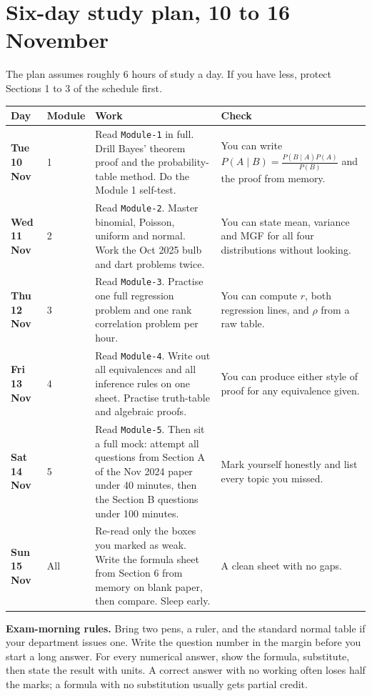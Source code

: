 \documentclass[11pt,a4paper]{article}
\begin{document}
\section{Six-day study plan, 10 to 16 November}

The plan assumes roughly 6 hours of study a day. If you have less, protect Sections 1 to 3 of the schedule first.

\begin{center}\small
\begin{tabularx}{\textwidth}{>{\bfseries}p{} p{} X p{}}
\toprule Day & Module & Work & Check\\\midrule
Tue 10 Nov & 1 & Read \texttt{Module-1} in full. Drill Bayes' theorem proof and the probability-table method. Do the Module 1 self-test. & You can write $P(A\mid B)=\frac{P(B\mid A)P(A)}{P(B)}$ and the proof from memory.\\
Wed 11 Nov & 2 & Read \texttt{Module-2}. Master binomial, Poisson, uniform and normal. Work the Oct 2025 bulb and dart problems twice. & You can state mean, variance and MGF for all four distributions without looking.\\
Thu 12 Nov & 3 & Read \texttt{Module-3}. Practise one full regression problem and one rank correlation problem per hour. & You can compute $r$, both regression lines, and $\rho$ from a raw table.\\
Fri 13 Nov & 4 & Read \texttt{Module-4}. Write out all equivalences and all inference rules on one sheet. Practise truth-table and algebraic proofs. & You can produce either style of proof for any equivalence given.\\
Sat 14 Nov & 5 & Read \texttt{Module-5}. Then sit a full mock: attempt all questions from Section A of the Nov 2024 paper under 40 minutes, then the Section B questions under 100 minutes. & Mark yourself honestly and list every topic you missed.\\
Sun 15 Nov & All & Re-read only the boxes you marked as weak. Write the formula sheet from Section 6 from memory on blank paper, then compare. Sleep early. & A clean sheet with no gaps.\\\bottomrule
\end{tabularx}
\end{center}

\begin{exambox}
\textbf{Exam-morning rules.} Bring two pens, a ruler, and the standard normal table if your department issues one. Write the question number in the margin before you start a long answer. For every numerical answer, show the formula, substitute, then state the result with units. A correct answer with no working often loses half the marks; a formula with no substitution usually gets partial credit.
\end{exambox}
\end{document}
